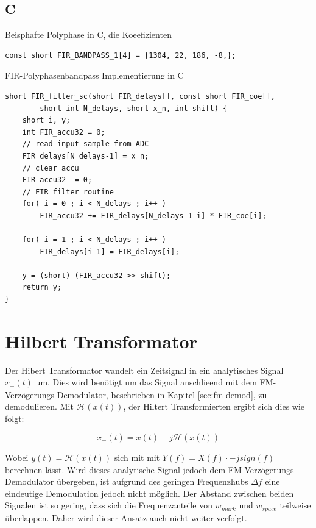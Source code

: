 \documentclass{article}
\begin{document}
\subsection{C}

\begin{listing}\label{codeC:dezimation}
    \caption{Beisphafte Polyphase in C, die Koeefizienten}
    \begin{verbatim}
const short FIR_BANDPASS_1[4] = {1304, 22, 186, -8,};
    \end{verbatim}
\end{listing}


\begin{listing}\label{codeC:FIR}
    \caption{FIR-Polyphasenbandpass Implementierung in C}
    \begin{verbatim}
short FIR_filter_sc(short FIR_delays[], const short FIR_coe[], 
        short int N_delays, short x_n, int shift) {
    short i, y;
    int FIR_accu32 = 0;
    // read input sample from ADC
    FIR_delays[N_delays-1] = x_n;	 
    // clear accu
    FIR_accu32	= 0;
    // FIR filter routine				
    for( i = 0 ; i < N_delays ; i++ )		
        FIR_accu32 += FIR_delays[N_delays-1-i] * FIR_coe[i];
    
    for( i = 1 ; i < N_delays ; i++ )				
        FIR_delays[i-1] = FIR_delays[i];

    y = (short) (FIR_accu32 >> shift);
    return y;
}
    \end{verbatim}
\end{listing}

\section{Hilbert Transformator}\label{sec:hilbert}
Der Hibert Transformator wandelt ein Zeitsignal in ein analytisches Signal $x_+(t)$ um.
Dies wird benötigt um das Signal anschlieend mit dem FM-Verzögerungs Demodulator, beschrieben in Kapitel \ref{sec:fm-demod}, zu demodulieren.
Mit $\mathcal{H}(x(t))$, der Hiltert Transformierten ergibt sich dies wie folgt:

$$ 
x_+(t) = x(t) + j \mathcal{H}(x(t))
$$

Wobei $y(t) = \mathcal{H}(x(t))$ sich mit mit $Y(f) = X(f) \cdot -j sign(f)$ berechnen lässt.
Wird dieses analytische Signal jedoch dem FM-Verzögerungs Demodulator übergeben, ist aufgrund des 
geringen Frequenzhubs $\varDelta f$ eine eindeutige Demodulation jedoch nicht möglich. Der Abstand zwischen beiden Signalen ist so gering, dass sich die 
Frequenzanteile von $w_{mark}$ und $w_{space}$ teilweise überlappen. Daher wird
dieser Ansatz auch nicht weiter verfolgt.
\end{document}
